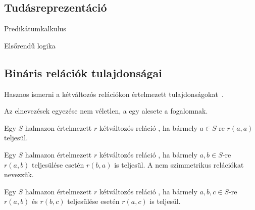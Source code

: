 \subsection{Tudásreprezentáció}

Predikátumkalkulus

Elsőrendű logika

\subsection{Bináris relációk tulajdonságai}

Hasznos ismerni a kétváltozós relációkon értelmezett tulajdonságokat~\cite{wiki:relacio}.

\begin{tipp}
	Az elnevezések egyezése nem véletlen, a  egy alesete a  fogalomnak.
\end{tipp}


\begin{definicio}
	Egy $S$ halmazon értelmezett $r$ kétváltozós reláció , ha bármely $a \in S$-re $r(a, a)$ teljesül.
\end{definicio}

\begin{definicio}
	Egy $S$ halmazon értelmezett $r$ kétváltozós reláció , ha bármely $a,b \in S$-re $r(a, b)$ teljesülése esetén $r(b, a)$ is teljesül. A nem szimmetrikus relációkat  nevezzük.
\end{definicio}

\begin{definicio}
	Egy $S$ halmazon értelmezett $r$ kétváltozós reláció , ha bármely $a,b,c \in S$-re $r(a, b)$ és $r(b, c)$ teljesülése esetén $r(a, c)$ is teljesül.
\end{definicio}

